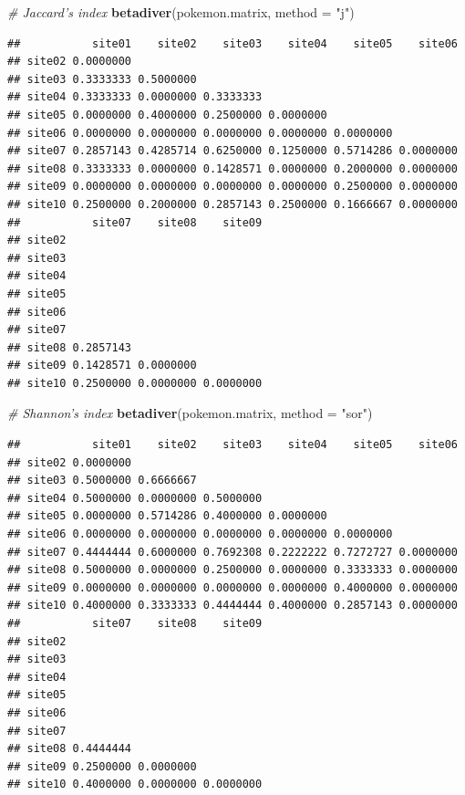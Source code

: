 \documentclass[]{book}
\newenvironment{Shaded}{\begin{snugshade}}{\end{snugshade}}
\newcommand{\KeywordTok}[1]{\textcolor[rgb]{0.13,0.29,0.53}{\textbf{{#1}}}}
\newcommand{\DataTypeTok}[1]{\textcolor[rgb]{0.13,0.29,0.53}{{#1}}}
\newcommand{\StringTok}[1]{\textcolor[rgb]{0.31,0.60,0.02}{{#1}}}
\newcommand{\CommentTok}[1]{\textcolor[rgb]{0.56,0.35,0.01}{\textit{{#1}}}}
\newcommand{\NormalTok}[1]{{#1}}
\begin{document}
\begin{Shaded}
\begin{Highlighting}[]
\CommentTok{# Jaccard's index}
\KeywordTok{betadiver}\NormalTok{(pokemon.matrix, }\DataTypeTok{method =} \StringTok{"j"}\NormalTok{)}
\end{Highlighting}
\end{Shaded}

\begin{verbatim}
##           site01    site02    site03    site04    site05    site06
## site02 0.0000000                                                  
## site03 0.3333333 0.5000000                                        
## site04 0.3333333 0.0000000 0.3333333                              
## site05 0.0000000 0.4000000 0.2500000 0.0000000                    
## site06 0.0000000 0.0000000 0.0000000 0.0000000 0.0000000          
## site07 0.2857143 0.4285714 0.6250000 0.1250000 0.5714286 0.0000000
## site08 0.3333333 0.0000000 0.1428571 0.0000000 0.2000000 0.0000000
## site09 0.0000000 0.0000000 0.0000000 0.0000000 0.2500000 0.0000000
## site10 0.2500000 0.2000000 0.2857143 0.2500000 0.1666667 0.0000000
##           site07    site08    site09
## site02                              
## site03                              
## site04                              
## site05                              
## site06                              
## site07                              
## site08 0.2857143                    
## site09 0.1428571 0.0000000          
## site10 0.2500000 0.0000000 0.0000000
\end{verbatim}

\begin{Shaded}
\begin{Highlighting}[]
\CommentTok{# Shannon's index}
\KeywordTok{betadiver}\NormalTok{(pokemon.matrix, }\DataTypeTok{method =} \StringTok{"sor"}\NormalTok{)}
\end{Highlighting}
\end{Shaded}

\begin{verbatim}
##           site01    site02    site03    site04    site05    site06
## site02 0.0000000                                                  
## site03 0.5000000 0.6666667                                        
## site04 0.5000000 0.0000000 0.5000000                              
## site05 0.0000000 0.5714286 0.4000000 0.0000000                    
## site06 0.0000000 0.0000000 0.0000000 0.0000000 0.0000000          
## site07 0.4444444 0.6000000 0.7692308 0.2222222 0.7272727 0.0000000
## site08 0.5000000 0.0000000 0.2500000 0.0000000 0.3333333 0.0000000
## site09 0.0000000 0.0000000 0.0000000 0.0000000 0.4000000 0.0000000
## site10 0.4000000 0.3333333 0.4444444 0.4000000 0.2857143 0.0000000
##           site07    site08    site09
## site02                              
## site03                              
## site04                              
## site05                              
## site06                              
## site07                              
## site08 0.4444444                    
## site09 0.2500000 0.0000000          
## site10 0.4000000 0.0000000 0.0000000
\end{verbatim}
\end{document}
